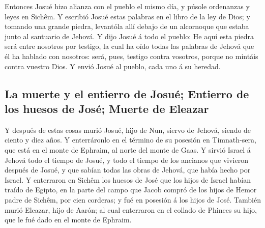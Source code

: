  Entonces Josué hizo alianza con el pueblo el mismo día,
y púsole ordenanzas y leyes en Sichêm.  Y escribió Josué
estas palabras en el libro de la ley de Dios; y tomando una grande
piedra, levantóla allí debajo de un alcornoque que estaba junto al
santuario de Jehová.  Y dijo Josué á todo el pueblo: He
aquí esta piedra será entre nosotros por testigo, la cual ha oído todas
las palabras de Jehová que él ha hablado con nosotros: será, pues,
testigo contra vosotros, porque no mintáis contra vuestro Dios.
 Y envió Josué al pueblo, cada uno á su heredad.

\hypertarget{la-muerte-y-el-entierro-de-josuuxe9-entierro-de-los-huesos-de-josuxe9-muerte-de-eleazar}{%
\subsection{La muerte y el entierro de Josué; Entierro de los huesos de
José; Muerte de
Eleazar}\label{la-muerte-y-el-entierro-de-josuuxe9-entierro-de-los-huesos-de-josuxe9-muerte-de-eleazar}}

 Y después de estas cosas murió Josué, hijo de Nun,
siervo de Jehová, siendo de ciento y diez años.  Y
enterráronlo en el término de su posesión en Timnath-sera, que está en
el monte de Ephraim, al norte del monte de Gaas.  Y
sirvió Israel á Jehová todo el tiempo de Josué, y todo el tiempo de los
ancianos que vivieron después de Josué, y que sabían todas las obras de
Jehová, que había hecho por Israel.  Y enterraron en
Sichêm los huesos de José que los hijos de Israel habían traído de
Egipto, en la parte del campo que Jacob compró de los hijos de Hemor
padre de Sichêm, por cien corderas; y fué en posesión á los hijos de
José.  También murió Eleazar, hijo de Aarón; al cual
enterraron en el collado de Phinees su hijo, que le fué dado en el monte
de Ephraim.
